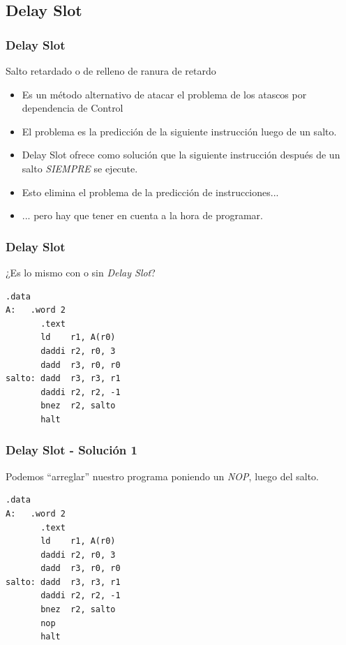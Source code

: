 \documentclass{beamer}
\begin{document}
\subsection{Delay Slot}
\begin{frame}
\frametitle{Delay Slot}
Salto retardado o de relleno de ranura de retardo
\begin{itemize}
\item Es un método alternativo de atacar el problema de los atascos por dependencia de Control
\item El problema es la predicción de la siguiente instrucción luego de un salto.
\item Delay Slot ofrece como solución que la siguiente instrucción después de un salto \emph{SIEMPRE} se ejecute.
\item Esto elimina el problema de la predicción de instrucciones...
\item ... pero hay que tener en cuenta a la hora de programar.

\end{itemize}
\end{frame}

\begin{frame}[fragile]
\frametitle{Delay Slot}
¿Es lo mismo con o sin \emph{Delay Slot}?
\begin{block}{}
\begin{lstlisting}[language=WinMIPS64,basicstyle=\ttfamily,keywordstyle=\color{blue}]
       .data
A:   .word 2
       .text
       ld    r1, A(r0)
       daddi r2, r0, 3
       dadd  r3, r0, r0
salto: dadd  r3, r3, r1
       daddi r2, r2, -1
       bnez  r2, salto
       halt
\end{lstlisting}
\end{block}
\end{frame}


\begin{frame}[fragile]
\frametitle{Delay Slot - Solución 1 }
Podemos ``arreglar'' nuestro programa poniendo un \emph{NOP}, luego del salto.
\begin{block}{}
\begin{lstlisting}[language=WinMIPS64,basicstyle=\ttfamily,keywordstyle=\color{blue}]
       .data
A:   .word 2
       .text
       ld    r1, A(r0)
       daddi r2, r0, 3
       dadd  r3, r0, r0
salto: dadd  r3, r3, r1
       daddi r2, r2, -1
       bnez  r2, salto
       nop
       halt
\end{lstlisting}
\end{block}
\end{frame}
\end{document}
